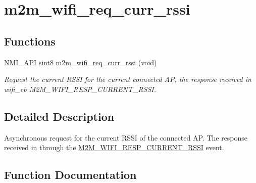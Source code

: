 \hypertarget{group__WifiReqCurrentRssiFn}{}\section{m2m\+\_\+wifi\+\_\+req\+\_\+curr\+\_\+rssi}
\label{group__WifiReqCurrentRssiFn}
\subsection*{Functions}
\begin{DoxyCompactItemize}
\item 
\hyperlink{group__BSPDefine_gaecc0323d771e41ef81a76b5f12783e22}{N\+M\+I\+\_\+\+A\+PI} \hyperlink{group__DataT_gae35f10ffd0ac8dd2bc3e794da9bdfbc7}{sint8} \hyperlink{group__WifiReqCurrentRssiFn_gaeb2391da3ba8b116b9a2275c09920f04}{m2m\+\_\+wifi\+\_\+req\+\_\+curr\+\_\+rssi} (void)
\begin{DoxyCompactList}\small\item\em Request the current R\+S\+SI for the current connected AP, the response received in wifi\+\_\+cb M2\+M\+\_\+\+W\+I\+F\+I\+\_\+\+R\+E\+S\+P\+\_\+\+C\+U\+R\+R\+E\+N\+T\+\_\+\+R\+S\+SI. \end{DoxyCompactList}\end{DoxyCompactItemize}


\subsection{Detailed Description}
Asynchronous request for the current R\+S\+SI of the connected AP. The response received in through the \hyperlink{group__WlanEnums_gga57466b36df595c593e7ccc9892e14b20ae2f28d3ff5c4356502abfc26d8f6e5f1}{M2\+M\+\_\+\+W\+I\+F\+I\+\_\+\+R\+E\+S\+P\+\_\+\+C\+U\+R\+R\+E\+N\+T\+\_\+\+R\+S\+SI} event. 

\subsection{Function Documentation}
\mbox{\label{group__WifiReqCurrentRssiFn_gaeb2391da3ba8b116b9a2275c09920f04}} 
